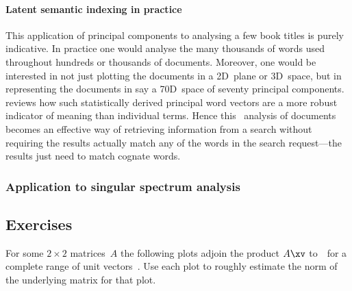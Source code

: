 \paragraph{Latent semantic indexing in practice}
This application of principal components to analysing a few book titles is purely indicative.
In practice one would analyse the many thousands of words used throughout hundreds or thousands of documents. 
Moreover, one would be interested in not just plotting the documents in a 2D~plane or 3D~space, but in representing the documents in say a 70D~space of seventy principal components.
\cite{Berry95} reviews how such statistically derived principal word vectors are a more robust indicator of meaning than individual terms.  
Hence this \svd\ analysis of documents becomes an effective way of retrieving information from a search without requiring the results actually match any of the words in the search request---the results just need to match cognate words.









\begin{draft}
\subsubsection {Application to singular spectrum analysis}
\label{sec:ssa}

\end{draft}







\subsection{Exercises}


\begin{exercise} \label{ex:} 
For some \(2\times2\) matrices~\(A\) the following plots adjoin the product \(A\xv\) to~\xv\ for a complete range of unit vectors~\xv.
Use each plot to roughly estimate the norm of the underlying matrix for that plot.
\begin{parts}
\item {}
\item {}
\item {}
\item {}
\item {}
\item {}
\end{parts}
\end{exercise}


